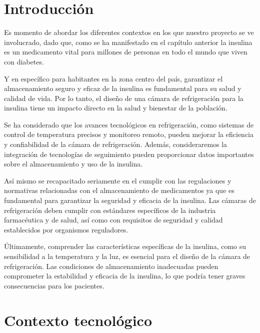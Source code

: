 \newpage 

\section*{Introducción}
\rsp
\setcounter{chapter}{2}
\setcounter{section}{0}
\setcounter{figure}{0}

\setcounter{page}{21}

Es momento de abordar los diferentes contextos en los que nuestro proyecto se ve involucrado, dado que, como se ha manifestado en el capítulo anterior la insulina es un medicamento vital para millones de personas en todo el mundo que viven con diabetes.

Y en específico para habitantes en la zona centro del país, garantizar el almacenamiento seguro y eficaz de la insulina es fundamental para su salud y calidad de vida. Por lo tanto, el diseño de una cámara de refrigeración para la insulina tiene un impacto directo en la salud y bienestar de la población.

Se ha considerado que los avances tecnológicos en refrigeración, como sistemas de control de temperatura precisos y monitoreo remoto, pueden mejorar la eficiencia y confiabilidad de la cámara de refrigeración. Además, consideraremos la integración de tecnologías de seguimiento pueden proporcionar datos importantes sobre el almacenamiento y uso de la insulina.

Así mismo se recapacitado seriamente en el cumplir con las regulaciones y normativas relacionadas con el almacenamiento de medicamentos ya que es fundamental para garantizar la seguridad y eficacia de la insulina. Las cámaras de refrigeración deben cumplir con estándares específicos de la industria farmacéutica y de salud, así como con requisitos de seguridad y calidad establecidos por organismos reguladores.

Últimamente, comprender las características específicas de la insulina, como su sensibilidad a la temperatura y la luz, es esencial para el diseño de la cámara de refrigeración. Las condiciones de almacenamiento inadecuadas pueden comprometer la estabilidad y eficacia de la insulina, lo que podría tener graves consecuencias para los pacientes.






\newpage

\section{Contexto tecnológico}

